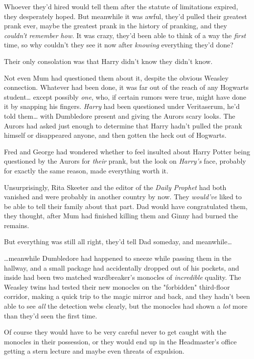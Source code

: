 Whoever they'd hired would tell them after the statute of limitations expired,
they desperately hoped. But meanwhile it was awful, they'd pulled their
greatest prank ever, maybe the greatest prank in the history of pranking, and
they \emph{couldn't remember how.} It was crazy, they'd been able to think of a
way the \emph{first} time, so why couldn't they see it now after \emph{knowing}
everything they'd done?

Their only consolation was that Harry didn't know they didn't know.

Not even Mum had questioned them about it, despite the obvious Weasley
connection. Whatever had been done, it was far out of the reach of any Hogwarts
student{\ldots} except possibly \emph{one}, who, if certain rumors were true,
might have done it by snapping his fingers. \emph{Harry} had been questioned
under Veritaserum, he'd told them{\ldots} with Dumbledore present and giving
the Aurors scary looks. The Aurors had asked just enough to determine that
Harry hadn't pulled the prank himself or disappeared anyone, and then gotten
the heck out of Hogwarts.

Fred and George had wondered whether to feel insulted about Harry Potter being
questioned by the Aurors for \emph{their} prank, but the look on \emph{Harry's}
face, probably for exactly the same reason, made everything worth it.

Unsurprisingly, Rita Skeeter and the editor of the \emph{Daily Prophet} had
both vanished and were probably in another country by now. They \emph{would've}
liked to be able to tell their family about that part. Dad would have
congratulated them, they thought, after Mum had finished killing them and Ginny
had burned the remains.

But everything was still all right, they'd tell Dad someday, and
meanwhile{\ldots}

{\ldots}meanwhile Dumbledore had happened to sneeze while passing them in the
hallway, and a small package had accidentally dropped out of his pockets, and
inside had been two matched wardbreaker's monocles of \emph{incredible}
quality. The Weasley twins had tested their new monocles on the "forbidden"
third-floor corridor, making a quick trip to the magic mirror and back, and
they hadn't been able to see \emph{all} the detection webs clearly, but the
monocles had shown a \emph{lot} more than they'd seen the first time.

Of course they would have to be very careful never to get caught with the
monocles in their possession, or they would end up in the Headmaster's office
getting a stern lecture and maybe even threats of expulsion.

